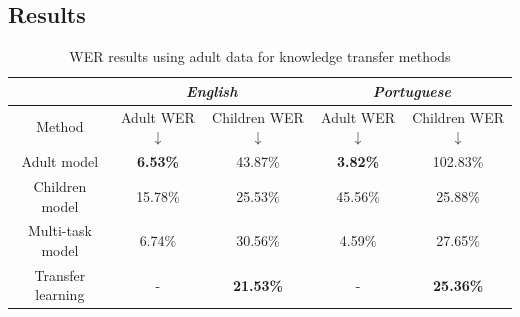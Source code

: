 \subsection{Results}

\begin{table}[h]
    \centering
    \begin{tabular}{c|cc|cc}
    \hline
                      & \multicolumn{2}{c}{\textit{English}} & \multicolumn{2}{|c}{\textit{Portuguese}} \\ \hline
    Method            & Adult WER  $\downarrow$  & Children WER $\downarrow$  & Adult WER  $\downarrow$   & Children WER  $\downarrow$   \\ \hline
    Adult model       & \textbf{6.53\%}      & 43.87\%       & \textbf{3.82\%}       & 102.83\%        \\
    Children model    & 15.78\%     & 25.53\%       & 45.56\%      & 25.88\%         \\
    Multi-task model  & 6.74\%      & 30.56\%       & 4.59\%       & 27.65\%         \\
    Transfer learning & -           & \textbf{21.53\%}       & -            & \textbf{25.36\%}         \\ \hline
    \end{tabular}
    \caption{WER results using adult data for knowledge transfer methods}
\label{tab:res_exp1}

    \end{table}






